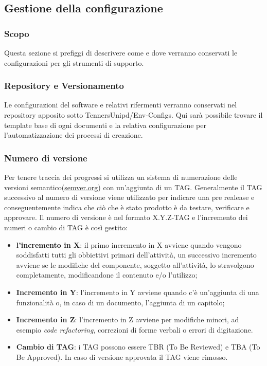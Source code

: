 \subsection{Gestione della configurazione}
\subsubsection{Scopo}
Questa sezione si prefiggi di descrivere come e dove verranno conservati le configurazioni
per gli strumenti di supporto.
\subsubsection{Repository e Versionamento}
Le configurazioni del software e relativi rifermenti verranno conservati nel repository
apposito sotto TennersUnipd/Env-Configs.
Qui sarà possibile trovare il template base di ogni documenti e la relativa configurazione
per l'automatizzazione dei processi di creazione.

\subsubsection{Numero di versione}
Per tenere traccia dei progressi si utilizza un sistema di numerazione delle versioni
semantico(\href{https://semver.org/lang/it/}{semver.org}) con un'aggiunta di un TAG.
Generalmente il TAG successivo al numero di versione viene utilizzato per indicare una
pre realease e conseguentemente indica che ciò che è stato prodotto è da testare,
verificare e approvare.
Il numero di versione è nel formato X.Y.Z-TAG e l'incremento dei numeri o cambio
di TAG è così gestito:
\begin{itemize}
  \item \textbf{l'incremento in X}: il primo incremento in X avviene quando vengono
  soddisfatti tutti gli obbiettivi primari dell'attività, un successivo incremento
  avviene se le modifiche del componente, soggetto all'attività, lo stravolgono
  completamente, modificandone il contenuto e/o l'utilizzo;
  \item \textbf{Incremento in Y}: l'incremento in Y avviene quando c'è un'aggiunta
  di una funzionalità o, in caso di un documento, l'aggiunta di un capitolo;
  \item \textbf{Incremento in Z}: l'incremento in Z avviene per modifiche minori,
  ad esempio \textit{code refactoring\glos}, correzioni di forme verbali o errori di digitazione.
  \item \textbf{Cambio di TAG}: i TAG possono essere TBR (To Be Reviewed) e TBA (To Be Approved).
  In caso di versione approvata il TAG viene rimosso.
\end{itemize}

